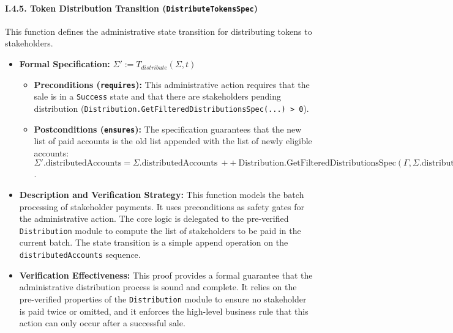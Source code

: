 \documentclass[
  english,
  onecolumn]{article}
\providecommand{\tightlist}{%
  \setlength{\itemsep}{0pt}\setlength{\parskip}{0pt}}
\begin{document}
\paragraph{\texorpdfstring{I.4.5. Token Distribution Transition
(\texttt{DistributeTokensSpec})}{I.4.5. Token Distribution Transition (DistributeTokensSpec)}}\label{i.4.5.-token-distribution-transition-distributetokensspec}

This function defines the administrative state transition for
distributing tokens to stakeholders.

\begin{itemize}
\tightlist
\item
  \textbf{Formal Specification:}
  \(\Sigma' := T_{distribute}(\Sigma, t)\)

  \begin{itemize}
  \tightlist
  \item
    \textbf{Preconditions (\texttt{requires}):} This administrative
    action requires that the sale is in a \texttt{Success} state and
    that there are stakeholders pending distribution
    (\texttt{\textbar{}Distribution.GetFilteredDistributionsSpec(...)\ \textgreater{}\ 0}).
  \item
    \textbf{Postconditions (\texttt{ensures}):} The specification
    guarantees that the new list of paid accounts is the old list
    appended with the list of newly eligible accounts:
    \(\Sigma'.\text{distributedAccounts} = \Sigma.\text{distributedAccounts} \ ++ \ \text{Distribution.GetFilteredDistributionsSpec}(\Gamma, \Sigma.\text{distributedAccounts})\).
  \end{itemize}
\item
  \textbf{Description and Verification Strategy:} This function models
  the batch processing of stakeholder payments. It uses preconditions as
  safety gates for the administrative action. The core logic is
  delegated to the pre-verified \texttt{Distribution} module to compute
  the list of stakeholders to be paid in the current batch. The state
  transition is a simple append operation on the
  \texttt{distributedAccounts} sequence.
\item
  \textbf{Verification Effectiveness:} This proof provides a formal
  guarantee that the administrative distribution process is sound and
  complete. It relies on the pre-verified properties of the
  \texttt{Distribution} module to ensure no stakeholder is paid twice or
  omitted, and it enforces the high-level business rule that this action
  can only occur after a successful sale.
\end{itemize}
\end{document}

